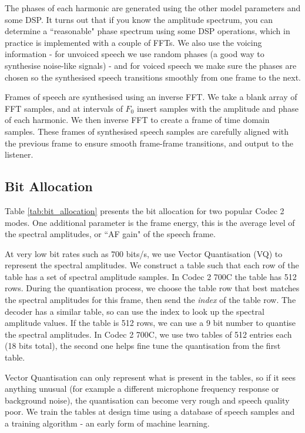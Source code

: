 \documentclass{article}
\begin{document}
{The phases of each harmonic are generated using the other model parameters and some DSP.  It turns out that if you know the amplitude spectrum, you can determine a ``reasonable" phase spectrum using some DSP operations, which in practice is implemented with a couple of FFTs.  We also use the voicing information - for unvoiced speech we use random phases (a good way to synthesise noise-like signals) - and for voiced speech we make sure the phases are chosen so the synthesised speech transitions smoothly from one frame to the next.

Frames of speech are synthesised using an inverse FFT.  We take a blank array of FFT samples, and at intervals of $F_0$ insert samples with the amplitude and phase of each harmonic.  We then inverse FFT to create a frame of time domain samples.  These frames of synthesised speech samples are carefully aligned with the previous frame to ensure smooth frame-frame transitions, and output to the listener.

\subsection{Bit Allocation}

Table \ref{tab:bit_allocation} presents the bit allocation for two popular Codec 2 modes.  One additional parameter is the frame energy, this is the average level of the spectral amplitudes, or ``AF gain" of the speech frame.

At very low bit rates such as 700 bits/s, we use Vector Quantisation (VQ) to represent the spectral amplitudes.  We construct a table such that each row of the table has a set of spectral amplitude samples.  In Codec 2 700C the table has 512 rows.  During the quantisation process, we choose the table row that best matches the spectral amplitudes for this frame, then send the \emph{index} of the table row.  The decoder has a similar table, so can use the index to look up the spectral amplitude values.  If the table is 512 rows, we can use a 9 bit number to quantise the spectral amplitudes.  In Codec 2 700C, we use two tables of 512 entries each (18 bits total), the second one helps fine tune the quantisation from the first table.

Vector Quantisation can only represent what is present in the tables, so if it sees anything unusual (for example a different microphone frequency response or background noise), the quantisation can become very rough and speech quality poor.  We train the tables at design time using a database of speech samples and a training algorithm - an early form of machine learning.

}
\end{document}
